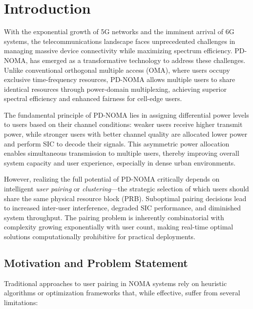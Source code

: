 \section{Introduction}
With the exponential growth of 5G networks and the imminent arrival of 6G systems, the telecommunications landscape faces unprecedented challenges in managing massive device connectivity while maximizing spectrum efficiency. PD-NOMA, has emerged as a transformative technology to address these challenges. Unlike conventional orthogonal multiple access (OMA), where users occupy exclusive time-frequency resources, PD-NOMA allows multiple users to share identical resources through power-domain multiplexing, achieving superior spectral efficiency and enhanced fairness for cell-edge users.

The fundamental principle of PD-NOMA lies in assigning differential power levels to users based on their channel conditions: weaker users receive higher transmit power, while stronger users with better channel quality are allocated lower power and perform SIC to decode their signals. This asymmetric power allocation enables simultaneous transmission to multiple users, thereby improving overall system capacity and user experience, especially in dense urban environments.

However, realizing the full potential of PD-NOMA critically depends on intelligent \emph{user pairing} or \emph{clustering}—the strategic selection of which users should share the same physical resource block (PRB). Suboptimal pairing decisions lead to increased inter-user interference, degraded SIC performance, and diminished system throughput. The pairing problem is inherently combinatorial with complexity growing exponentially with user count, making real-time optimal solutions computationally prohibitive for practical deployments.

\subsection{Motivation and Problem Statement}

Traditional approaches to user pairing in NOMA systems rely on heuristic algorithms or optimization frameworks that, while effective, suffer from several limitations:

